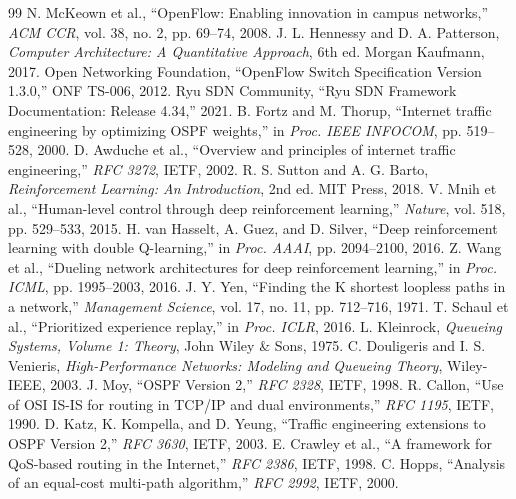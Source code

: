 \documentclass[12pt,a4paper,oneside]{report}
\begin{document}
\begin{thebibliography}{99}
 N. McKeown et al., ``OpenFlow: Enabling innovation in campus networks,'' \textit{ACM CCR}, vol. 38, no. 2, pp. 69--74, 2008.
 J. L. Hennessy and D. A. Patterson, \textit{Computer Architecture: A Quantitative Approach}, 6th ed. Morgan Kaufmann, 2017.
 Open Networking Foundation, ``OpenFlow Switch Specification Version 1.3.0,'' ONF TS-006, 2012.
 Ryu SDN Community, ``Ryu SDN Framework Documentation: Release 4.34,'' 2021.
 B. Fortz and M. Thorup, ``Internet traffic engineering by optimizing OSPF weights,'' in \textit{Proc. IEEE INFOCOM}, pp. 519--528, 2000.
 D. Awduche et al., ``Overview and principles of internet traffic engineering,'' \textit{RFC 3272}, IETF, 2002.
 R. S. Sutton and A. G. Barto, \textit{Reinforcement Learning: An Introduction}, 2nd ed. MIT Press, 2018.
 V. Mnih et al., ``Human-level control through deep reinforcement learning,'' \textit{Nature}, vol. 518, pp. 529--533, 2015.
 H. van Hasselt, A. Guez, and D. Silver, ``Deep reinforcement learning with double Q-learning,'' in \textit{Proc. AAAI}, pp. 2094--2100, 2016.
 Z. Wang et al., ``Dueling network architectures for deep reinforcement learning,'' in \textit{Proc. ICML}, pp. 1995--2003, 2016.
 J. Y. Yen, ``Finding the K shortest loopless paths in a network,'' \textit{Management Science}, vol. 17, no. 11, pp. 712--716, 1971.
 T. Schaul et al., ``Prioritized experience replay,'' in \textit{Proc. ICLR}, 2016.
 L. Kleinrock, \textit{Queueing Systems, Volume 1: Theory}, John Wiley \& Sons, 1975.
 C. Douligeris and I. S. Venieris, \textit{High-Performance Networks: Modeling and Queueing Theory}, Wiley-IEEE, 2003.
 J. Moy, ``OSPF Version 2,'' \textit{RFC 2328}, IETF, 1998.
 R. Callon, ``Use of OSI IS-IS for routing in TCP/IP and dual environments,'' \textit{RFC 1195}, IETF, 1990.
 D. Katz, K. Kompella, and D. Yeung, ``Traffic engineering extensions to OSPF Version 2,'' \textit{RFC 3630}, IETF, 2003.
 E. Crawley et al., ``A framework for QoS-based routing in the Internet,'' \textit{RFC 2386}, IETF, 1998.
 C. Hopps, ``Analysis of an equal-cost multi-path algorithm,'' \textit{RFC 2992}, IETF, 2000.

\end{thebibliography}
\end{document}
